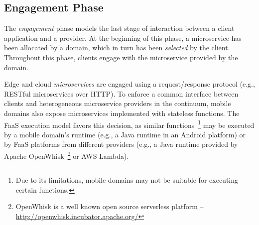 \subsection*{Engagement Phase}\label{sec:A3-E-engagement}

The \textit{engagement} phase models the last stage of interaction between a client application and a provider. At the beginning of this phase, a microservice has been allocated by a domain, which in turn has been \textit{selected} by the client. Throughout this phase, clients engage with the microservice provided by the domain.

Edge and cloud \textit{microservices} are engaged using a request/response protocol (e.g., RESTful microservices over HTTP). To enforce a common interface between clients and heterogeneous microservice providers in the continuum, mobile domains also expose microservices implemented with stateless functions. The FaaS execution model favors this decision, as similar functions~\footnote{Due to its limitations, mobile domains may not be suitable for executing certain functions.} may be executed by a mobile domain's runtime (e.g., a Java runtime in an Android platform) or by FaaS platforms from different providers (e.g., a Java runtime provided by Apache OpenWhisk~\footnote{OpenWhisk is a well known open source serverless platform -- \url{http://openwhisk.incubator.apache.org/}} or AWS Lambda).








